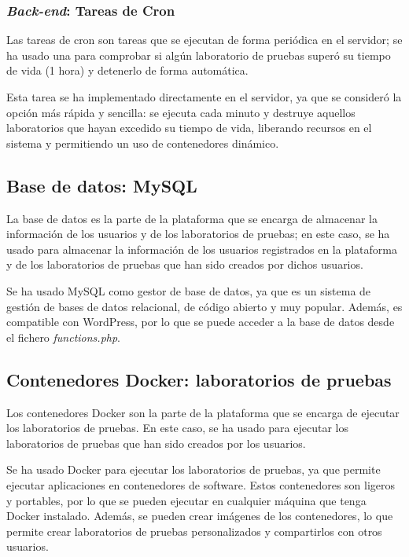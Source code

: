             \subsubsection{\textit{Back-end}: Tareas de Cron}

                Las tareas de cron son tareas que se ejecutan de forma periódica en el servidor; se ha usado una para comprobar si algún laboratorio de pruebas superó su tiempo de vida (1 hora) y detenerlo de forma automática.
                
                Esta tarea se ha implementado directamente en el servidor, ya que se consideró la opción más rápida y sencilla: se ejecuta cada minuto y destruye aquellos laboratorios que hayan excedido su tiempo de vida, liberando recursos en el sistema y permitiendo un uso de contenedores dinámico.


        \subsection{Base de datos: MySQL}

            La base de datos es la parte de la plataforma que se encarga de almacenar la información de los usuarios y de los laboratorios de pruebas; en este caso, se ha usado para almacenar la información de los usuarios registrados en la plataforma y de los laboratorios de pruebas que han sido creados por dichos usuarios.
            
            Se ha usado MySQL como gestor de base de datos, ya que es un sistema de gestión de bases de datos relacional, de código abierto y muy popular. Además, es compatible con WordPress, por lo que se puede acceder a la base de datos desde el fichero \textit{functions.php}.
        
        
        \subsection{Contenedores Docker: laboratorios de pruebas}

            Los contenedores Docker son la parte de la plataforma que se encarga de ejecutar los laboratorios de pruebas. En este caso, se ha usado para ejecutar los laboratorios de pruebas que han sido creados por los usuarios.
            
            Se ha usado Docker para ejecutar los laboratorios de pruebas, ya que permite ejecutar aplicaciones en contenedores de software. Estos contenedores son ligeros y portables, por lo que se pueden ejecutar en cualquier máquina que tenga Docker instalado. Además, se pueden crear imágenes de los contenedores, lo que permite crear laboratorios de pruebas personalizados y compartirlos con otros usuarios.

